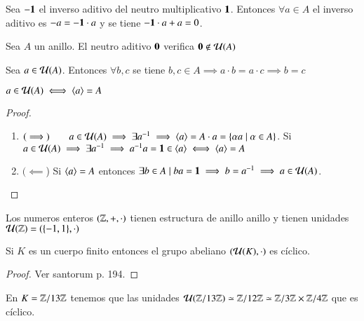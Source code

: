 \begin{pro}
	Sea $-\mathbf{1}$ el inverso aditivo del neutro multiplicativo $\mathbf{1}$. Entonces $\forall a \in A$ el inverso aditivo es $-a = -\mathbf{1} \cdot a$ y se tiene $-\mathbf{1}\cdot a + a = 0$.
\end{pro}

\begin{pro}
	Sea $A$ un anillo. El neutro aditivo $\mathbf{0}$ verifica $\mathbf{0} \not\in \mathcal{U}(A)$
\end{pro}

\begin{pro}
	Sea $a \in \mathcal{U}(A)$. Entonces $\forall b,c$ se tiene $b, c \in A \implies a\cdot b = a\cdot c \implies b = c$
\end{pro}

\begin{pro}
	$a \in \mathcal{U}(A) \iff \langle a\rangle = A$
\end{pro}

\begin{proof}$ $\newline
	\begin{enumerate}
		\item $(\implies)\qquad a \in \mathcal{U}(A) \implies \exists a^{-1} \implies \langle a\rangle = A\cdot a = \{\alpha a \mid \alpha \in A\}$. Si $a \in \mathcal{U}(A) \implies \exists a^{-1} \implies a^{-1}a = \mathbf{1} \in \langle a\rangle \iff \langle a\rangle = A$
		
		\item $(\impliedby$) Si $\langle a\rangle = A$ entonces $\exists b \in A \mid ba = \mathbf{1} \implies b = a^{-1} \implies a \in \mathcal{U}(A)$.
	\end{enumerate}
\end{proof}

\begin{ej}
	Los numeros enteros $(\mathbb{Z}, +, \cdot)$ tienen estructura de anillo anillo y tienen unidades $\mathcal{U}(\mathbb{Z}) = (\{-1, 1\}, \cdot)$
\end{ej}

\begin{pro}
	Si $K$ es un cuerpo finito entonces el grupo abeliano $(\mathcal{U}(K), \cdot)$ es cíclico.
\end{pro}

\begin{proof}
	Ver santorum p. 194.
\end{proof}

\begin{ej}
	En $K = \mathbb{Z}/13\mathbb{Z}$ tenemos que las unidades $\mathcal{U}(\mathbb{Z}/13\mathbb{Z}) \simeq \mathbb{Z}/12\mathbb{Z} \simeq \mathbb{Z}/3\mathbb{Z} \times \mathbb{Z}/4\mathbb{Z}$ que es cíclico.
\end{ej}

